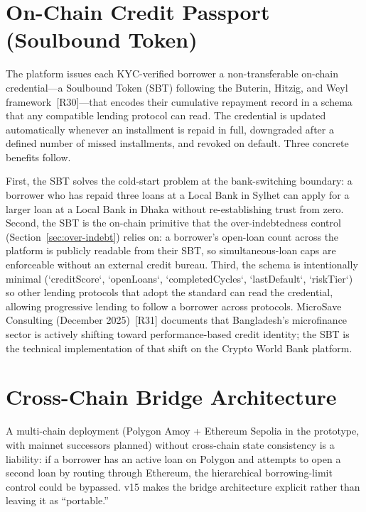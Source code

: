 \documentclass[12pt,a4paper]{report}
\begin{document}
\section{On-Chain Credit Passport (Soulbound Token)}
\label{sec:credit-passport}

The platform issues each KYC-verified borrower a non-transferable on-chain credential---a Soulbound Token (SBT) following the Buterin, Hitzig, and Weyl framework~[R30]---that encodes their cumulative repayment record in a schema that any compatible lending protocol can read. The credential is updated automatically whenever an installment is repaid in full, downgraded after a defined number of missed installments, and revoked on default. Three concrete benefits follow.

First, the SBT solves the cold-start problem at the bank-switching boundary: a borrower who has repaid three loans at a Local Bank in Sylhet can apply for a larger loan at a Local Bank in Dhaka without re-establishing trust from zero. Second, the SBT is the on-chain primitive that the over-indebtedness control (Section~\ref{sec:over-indebt}) relies on: a borrower's open-loan count across the platform is publicly readable from their SBT, so simultaneous-loan caps are enforceable without an external credit bureau. Third, the schema is intentionally minimal (`creditScore`, `openLoans`, `completedCycles`, `lastDefault`, `riskTier`) so other lending protocols that adopt the standard can read the credential, allowing progressive lending to follow a borrower across protocols. MicroSave Consulting (December 2025)~[R31] documents that Bangladesh's microfinance sector is actively shifting toward performance-based credit identity; the SBT is the technical implementation of that shift on the Crypto World Bank platform.

\section{Cross-Chain Bridge Architecture}
\label{sec:bridge}

A multi-chain deployment (Polygon Amoy + Ethereum Sepolia in the prototype, with mainnet successors planned) without cross-chain state consistency is a liability: if a borrower has an active loan on Polygon and attempts to open a second loan by routing through Ethereum, the hierarchical borrowing-limit control could be bypassed. v15 makes the bridge architecture explicit rather than leaving it as ``portable.''
\end{document}
